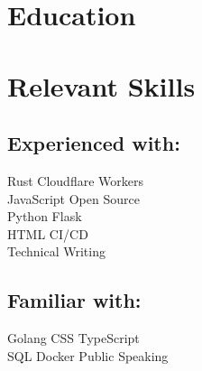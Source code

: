 \documentclass[]{deedy-resume-openfont}
\begin{document}
\section{Education}
\sectionsep

\section{Relevant Skills}
\begin{minipage}[t]{.4\textwidth}
\subsection{Experienced with:}
Rust \textbullet{} Cloudflare Workers \\ JavaScript \textbullet{} Open Source \\ Python \textbullet{} Flask \\ HTML \textbullet{} CI/CD \\ Technical Writing
\sectionsep
\end{minipage}
\hfill
\begin{minipage}[t]{.5\textwidth}
\subsection{Familiar with:}
Golang \textbullet{} CSS \textbullet{} TypeScript \\ SQL \textbullet{} Docker \textbullet{} Public Speaking
\end{minipage}
\end{document}

